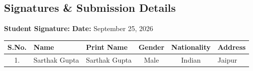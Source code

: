 \documentclass[11pt,a4paper]{article}
\begin{document}
\subsection*{Signatures \& Submission Details}

\noindent \textbf{Student Signature:} \underline{\hspace{6cm}} \hfill \textbf{Date:} September 25, 2026\\[1.5em]

\begin{table}[h!]
\centering
\small
\renewcommand{\arraystretch}{1.3}
\begin{tabularx}{\textwidth}{|c|p{3.5cm}|p{3.5cm}|c|c|X|}
\hline
\textbf{S.No.} & \textbf{Name} & \textbf{Print Name} & \textbf{Gender} & \textbf{Nationality} & \textbf{Address} \\ \hline
1. & Sarthak Gupta & Sarthak Gupta & Male & Indian & Jaipur \\ \hline
\end{tabularx}
\end{table}
\end{document}
